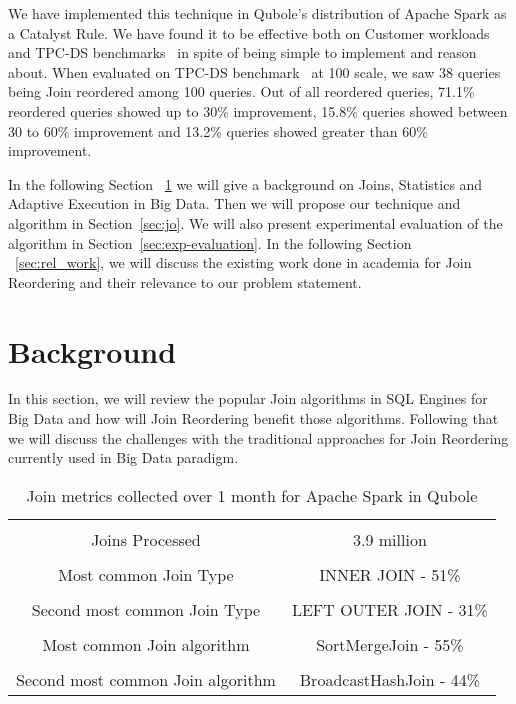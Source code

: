 \documentclass[conference]{IEEEtran}
\begin{document}
We have implemented this technique in Qubole's distribution of Apache Spark as a Catalyst Rule. We have found it to be effective both on Customer workloads and TPC-DS benchmarks~\cite{b14} in spite of being simple to implement and reason about. When evaluated on TPC-DS benchmark~\cite{b14}  at 100 scale, we saw 38 queries being Join reordered among 100 queries. Out of all reordered queries, 71.1\% reordered queries showed up to 30\% improvement, 15.8\% queries showed between 30 to 60\% improvement and 13.2\% queries showed greater than 60\% improvement.

In the following Section ~\ref{sec:background} we will give a background on Joins, Statistics and Adaptive Execution in Big Data. Then we will propose our technique and algorithm in Section~\ref{sec:jo}. We will also present experimental evaluation of the algorithm in Section~\ref{sec:exp-evaluation}. In the following Section ~\ref{sec:rel_work}, we will discuss the existing work done in academia for Join Reordering and their relevance to our problem statement.

\section{Background}\label{sec:background}

In this section, we will review the popular Join algorithms in SQL Engines for Big Data and how will Join Reordering benefit those algorithms. Following that we will discuss the challenges with the traditional approaches for Join Reordering currently used in Big Data paradigm.

\begin{table}[h]
\begin{center}
\begin{tabular}{ |c|c| }
 \hline \\
Joins Processed & 3.9 million \\ \hline \\
Most common Join Type & INNER JOIN - 51\%  \\  \hline \\
Second most common Join Type &  LEFT OUTER JOIN - 31\%\\ \hline  \\
Most common Join algorithm & SortMergeJoin - 55\%\\ \hline \\
Second most common Join algorithm & BroadcastHashJoin - 44\%\\
 \hline
\end{tabular}
\label{tab:stats}
\end{center}
\caption{Join metrics collected over 1 month for Apache Spark in Qubole}
\end{table}
\end{document}
